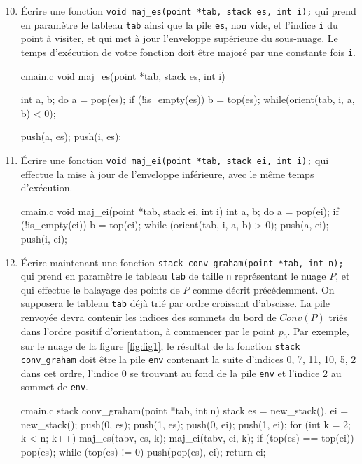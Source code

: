 \documentclass[a4paper,french,bookmarks]{article}
\begin{document}
\begin{enumerate}[resume]
\setcounter{enumi}{9}
\item Écrire une fonction \verb|void maj_es(point *tab, stack es, int i);| qui prend en paramètre le tableau  \verb|tab| ainsi que la pile  \verb|es|, non vide, et l’indice  \verb|i| du point à visiter, et qui met à jour l’enveloppe supérieure du sous-nuage. Le temps d’exécution de votre fonction doit être majoré par une constante fois \verb|i|.

\begin{code}{c}{main.c}
void maj_es(point *tab, stack es, int i) {
    int a, b;
    do {
        a = pop(es);
        if (!is_empty(es)) b = top(es);
    } while(orient(tab, i, a, b) < 0);
    
    push(a, es);
    push(i, es);
}
\end{code}

\item Écrire une fonction \verb|void maj_ei(point *tab, stack ei, int i);| qui effectue la mise
à jour de l’enveloppe inférieure, avec le même temps d’exécution.

\begin{code}{c}{main.c}
void maj_ei(point *tab, stack ei, int i) {
    int a, b;
    do {
        a = pop(ei);
        if (!is_empty(ei)) b = top(ei);
    } while (orient(tab, i, a, b) > 0);
    push(a, ei);
    push(i, ei);
}
\end{code}


\item Écrire maintenant une fonction \verb|stack conv_graham(point *tab, int n);| qui prend en
paramètre le tableau \verb|tab| de taille \verb|n| représentant le nuage $P$, et qui effectue le balayage des points de $P$ comme décrit précédemment. On supposera le tableau \verb|tab| déjà trié par ordre croissant d’abscisse.
La pile renvoyée devra contenir les indices des sommets du bord de $Conv(P)$ triés dans l’ordre positif d’orientation, à commencer par le point $p_0$.
Par exemple, sur le nuage de la figure \ref{fig:fig1}, le résultat de la fonction \verb|stack conv_graham| doit être la pile \verb|env| contenant la suite d’indices 0, 7, 11, 10, 5, 2 dans cet ordre, l’indice 0 se trouvant au fond de la pile \verb|env| et l’indice 2 au sommet de \verb|env|.

\begin{code}{c}{main.c}
stack conv_graham(point *tab, int n) {
    stack es = new_stack(), ei = new_stack();
    push(0, es);
    push(1, es);
    push(0, ei);
    push(1, ei);
    for (int k = 2; k < n; k++) {
        maj_es(tabv, es, k);
        maj_ei(tabv, ei, k);
    }
    if (top(es) == top(ei)) pop(es);
    while (top(es) != 0) push(pop(es), ei);
    return ei;
}
\end{code}


\end{enumerate}
\end{document}
